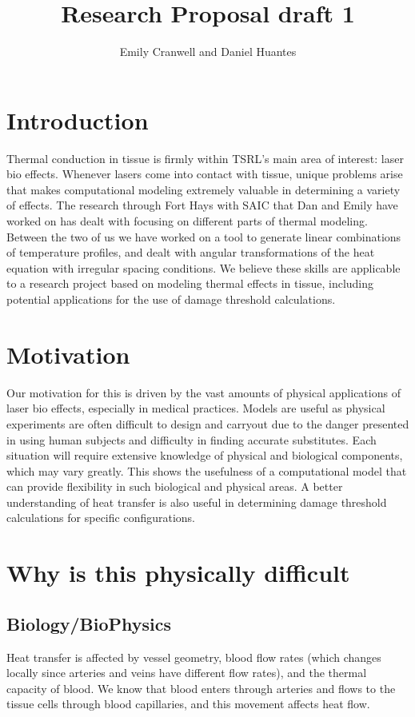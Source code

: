 \documentclass[12pt]{article}
\begin{document}
\title{Research Proposal
\large draft 1}
\author{Emily Cranwell and Daniel Huantes}
\maketitle
\section{Introduction}
Thermal conduction in tissue is firmly within TSRL's main area of interest: laser bio effects. Whenever lasers come into contact with tissue, unique problems arise that makes computational modeling extremely valuable in determining a variety of effects. The research through Fort Hays with SAIC that Dan and Emily have worked on has dealt with focusing on different parts of thermal modeling. Between the two of us we have worked on a tool to generate linear combinations of temperature profiles, and dealt with angular transformations of the heat equation with irregular spacing conditions. We believe these skills are applicable to a research project based on modeling thermal effects in tissue, including potential applications for the use of damage threshold calculations.

\section{Motivation}
Our motivation for this is driven by the vast amounts of physical applications of laser bio effects, especially in medical practices. Models are useful as physical experiments are often difficult to design and carryout due to the danger presented in using human subjects and difficulty in finding accurate substitutes. Each situation will require extensive knowledge of physical and biological components, which may vary greatly. This shows the usefulness of a computational model that can provide flexibility in such biological and physical areas. A better understanding of heat transfer is also useful in determining damage threshold calculations for specific configurations. 

\section{Why is this physically difficult}

\subsection{Biology/BioPhysics}
Heat transfer is affected by vessel geometry, blood flow rates (which changes locally since arteries and veins have different flow rates), and the thermal capacity of blood. We know that blood enters through arteries and flows to the tissue cells through blood capillaries, and this movement affects heat flow. 
\end{document}
